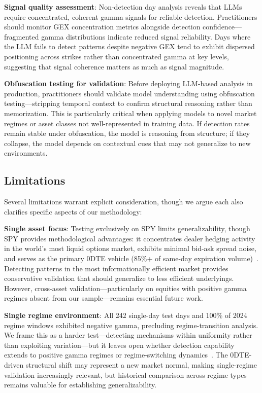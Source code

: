 \textbf{Signal quality assessment}: Non-detection day analysis reveals that LLMs require concentrated, coherent gamma signals for reliable detection. Practitioners should monitor GEX concentration metrics alongside detection confidence---fragmented gamma distributions indicate reduced signal reliability. Days where the LLM fails to detect patterns despite negative GEX tend to exhibit dispersed positioning across strikes rather than concentrated gamma at key levels, suggesting that signal coherence matters as much as signal magnitude.

\textbf{Obfuscation testing for validation}: Before deploying LLM-based analysis in production, practitioners should validate model understanding using obfuscation testing---stripping temporal context to confirm structural reasoning rather than memorization. This is particularly critical when applying models to novel market regimes or asset classes not well-represented in training data. If detection rates remain stable under obfuscation, the model is reasoning from structure; if they collapse, the model depends on contextual cues that may not generalize to new environments.

\subsection{Limitations}

Several limitations warrant explicit consideration, though we argue each also clarifies specific aspects of our methodology:

\textbf{Single asset focus}: Testing exclusively on SPY limits generalizability, though SPY provides methodological advantages: it concentrates dealer hedging activity in the world's most liquid options market, exhibits minimal bid-ask spread noise, and serves as the primary 0DTE vehicle (85\%+ of same-day expiration volume)~\cite{cboe2024zero}. Detecting patterns in the most informationally efficient market provides conservative validation that should generalize to less efficient underlyings. However, cross-asset validation---particularly on equities with positive gamma regimes absent from our sample---remains essential future work.

\textbf{Single regime environment}: All 242 single-day test days and 100\% of 2024 regime windows exhibited negative gamma, precluding regime-transition analysis. We frame this as a harder test---detecting mechanisms within uniformity rather than exploiting variation---but it leaves open whether detection capability extends to positive gamma regimes or regime-switching dynamics~\cite{ni2005stock,garleanu2009demand}. The 0DTE-driven structural shift may represent a new market normal, making single-regime validation increasingly relevant, but historical comparison across regime types remains valuable for establishing generalizability.

